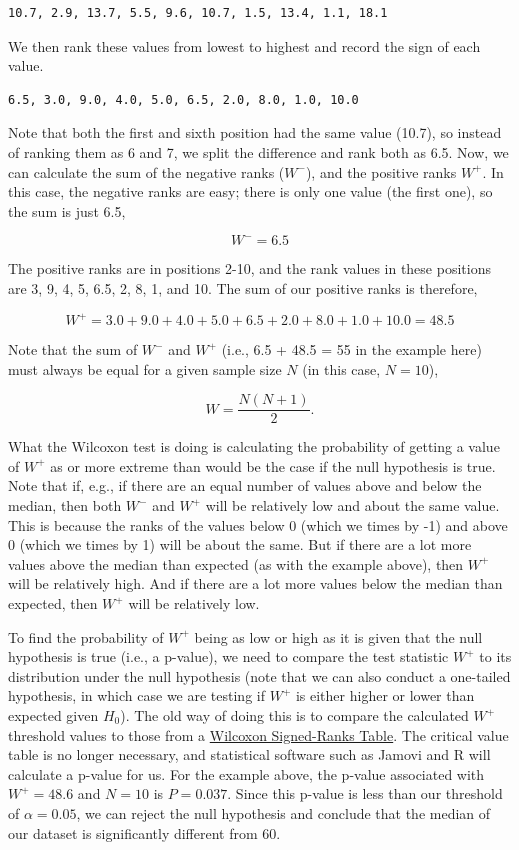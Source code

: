 \documentclass[
]{scrbook}
\begin{document}
\begin{verbatim}
10.7, 2.9, 13.7, 5.5, 9.6, 10.7, 1.5, 13.4, 1.1, 18.1
\end{verbatim}

We then rank these values from lowest to highest and record the sign of each value.

\begin{verbatim}
6.5, 3.0, 9.0, 4.0, 5.0, 6.5, 2.0, 8.0, 1.0, 10.0
\end{verbatim}

Note that both the first and sixth position had the same value (10.7), so instead of ranking them as 6 and 7, we split the difference and rank both as 6.5.
Now, we can calculate the sum of the negative ranks (\(W^{-}\)), and the positive ranks \(W^{+}\).
In this case, the negative ranks are easy; there is only one value (the first one), so the sum is just 6.5,

\[W^{-} = 6.5\]

The positive ranks are in positions 2-10, and the rank values in these positions are 3, 9, 4, 5, 6.5, 2, 8, 1, and 10.
The sum of our positive ranks is therefore,

\[W^{+} = 3.0 + 9.0 + 4.0 + 5.0 + 6.5 + 2.0 + 8.0 + 1.0 + 10.0 = 48.5\]

Note that the sum of \(W^{-}\) and \(W^{+}\) (i.e., 6.5 + 48.5 = 55 in the example here) must always be equal for a given sample size \(N\) (in this case, \(N = 10\)),

\[W = \frac{N \left(N + 1 \right)}{2}.\]

What the Wilcoxon test is doing is calculating the probability of getting a value of \(W^{+}\) as or more extreme than would be the case if the null hypothesis is true.
Note that if, e.g., if there are an equal number of values above and below the median, then both \(W^{-}\) and \(W^{+}\) will be relatively low and about the same value.
This is because the ranks of the values below 0 (which we times by -1) and above 0 (which we times by 1) will be about the same.
But if there are a lot more values above the median than expected (as with the example above), then \(W^{+}\) will be relatively high.
And if there are a lot more values below the median than expected, then \(W^{+}\) will be relatively low.

To find the probability of \(W^{+}\) being as low or high as it is given that the null hypothesis is true (i.e., a p-value), we need to compare the test statistic \(W^{+}\) to its distribution under the null hypothesis (note that we can also conduct a one-tailed hypothesis, in which case we are testing if \(W^{+}\) is either higher or lower than expected given \(H_{0}\)).
The old way of doing this is to compare the calculated \(W^{+}\) threshold values to those from a \protect\hyperlink{wilcoxon-signed-rank-critical-values}{Wilcoxon Signed-Ranks Table}.
The critical value table is no longer necessary, and statistical software such as Jamovi and R will calculate a p-value for us.
For the example above, the p-value associated with \(W^{+} = 48.6\) and \(N = 10\) is \(P = 0.037\).
Since this p-value is less than our threshold of \(\alpha = 0.05\), we can reject the null hypothesis and conclude that the median of our dataset is significantly different from 60.
\end{document}
